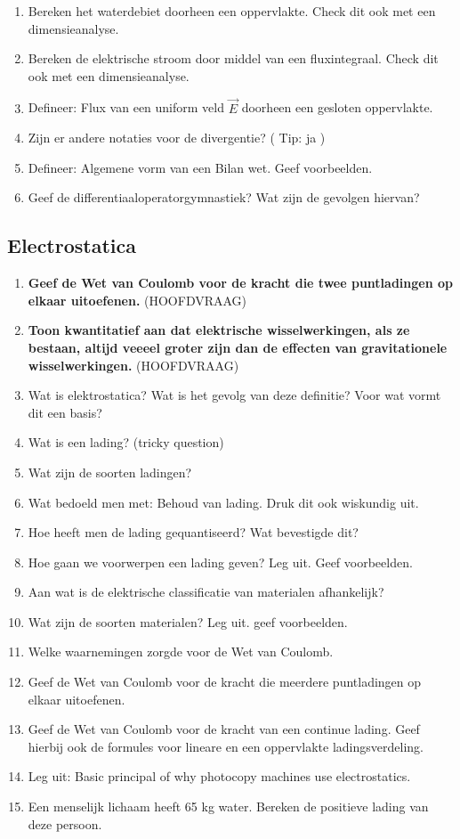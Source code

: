 \documentclass[a4paper,12pt]{article}
\begin{document}
\begin{enumerate}
        \item Bereken het waterdebiet doorheen een oppervlakte. Check dit ook met een dimensieanalyse.
        \item Bereken de elektrische stroom door middel van een fluxintegraal. Check dit ook met een dimensieanalyse.
        \item Defineer: Flux van een uniform veld $\vec{E}$ doorheen een gesloten oppervlakte.
        \item Zijn er andere notaties voor de divergentie? ( Tip: ja )
        \item Defineer: Algemene vorm van een Bilan wet. Geef voorbeelden.
        \item Geef de differentiaaloperatorgymnastiek? Wat zijn de gevolgen hiervan?
    \end{enumerate}
    \subsection{Electrostatica}
    \begin{enumerate}
        \item \textbf{Geef de Wet van Coulomb voor de kracht die twee puntladingen op elkaar uitoefenen.} (HOOFDVRAAG)
        \item \textbf{Toon kwantitatief aan dat elektrische wisselwerkingen, als ze bestaan, altijd veeeel groter zijn dan de effecten van gravitationele wisselwerkingen.} (HOOFDVRAAG)
        \item Wat is elektrostatica? Wat is het gevolg van deze definitie? Voor wat vormt dit een basis? 
        \item Wat is een lading? (tricky question)
        \item Wat zijn de soorten ladingen?
        \item Wat bedoeld men met: Behoud van lading. Druk dit ook wiskundig uit.
        \item Hoe heeft men de lading gequantiseerd? Wat bevestigde dit?
        \item Hoe gaan we voorwerpen een lading geven? Leg uit. Geef voorbeelden.
        \item Aan wat is de elektrische classificatie van materialen afhankelijk?
        \item Wat zijn de soorten materialen? Leg uit. geef voorbeelden.
        \item Welke waarnemingen zorgde voor de Wet van Coulomb.
        \item Geef de Wet van Coulomb voor de kracht die meerdere puntladingen op elkaar uitoefenen.
        \item Geef de Wet van Coulomb voor de kracht van een continue lading. Geef hierbij ook de formules voor lineare en een oppervlakte ladingsverdeling.
        \item Leg uit: Basic principal of why photocopy machines use electrostatics.
        \item Een menselijk lichaam heeft 65 kg water. Bereken de positieve lading van deze persoon.
    \end{enumerate}
\end{document}
